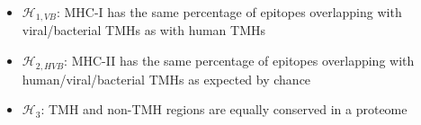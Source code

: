 
\begin{itemize}
  \item $\mathcal{H}_{1,VB}$: MHC-I has the same percentage of epitopes overlapping
    with viral/bacterial TMHs as with human TMHs
  \item $\mathcal{H}_{2,HVB}$: MHC-II has the same percentage of epitopes overlapping
    with human/viral/bacterial TMHs as expected by chance
  \item $\mathcal{H}_{3}$: TMH and non-TMH regions are equally conserved
    in a proteome
\end{itemize}


%
%




